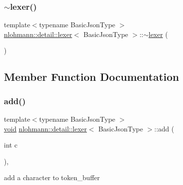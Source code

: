 \subsubsection{\texorpdfstring{$\sim$lexer()}{~lexer()}}
{\footnotesize\ttfamily template$<$typename Basic\+Json\+Type $>$ \\
\mbox{\hyperlink{classnlohmann_1_1detail_1_1lexer}{nlohmann\+::detail\+::lexer}}$<$ Basic\+Json\+Type $>$\+::$\sim$\mbox{\hyperlink{classnlohmann_1_1detail_1_1lexer}{lexer}} (\begin{DoxyParamCaption}{ }\end{DoxyParamCaption})\hspace{0.3cm}{\ttfamily [default]}}



\subsection{Member Function Documentation}
\mbox{\label{classnlohmann_1_1detail_1_1lexer_acec899d31af1fd647911e46e8535c283}} 
\subsubsection{\texorpdfstring{add()}{add()}}
{\footnotesize\ttfamily template$<$typename Basic\+Json\+Type $>$ \\
\mbox{\hyperlink{namespacenlohmann_1_1detail_a59fca69799f6b9e366710cb9043aa77d}{void}} \mbox{\hyperlink{classnlohmann_1_1detail_1_1lexer}{nlohmann\+::detail\+::lexer}}$<$ Basic\+Json\+Type $>$\+::add (\begin{DoxyParamCaption}\item[{int}]{c }\end{DoxyParamCaption})\hspace{0.3cm}{\ttfamily [inline]}, {\ttfamily [private]}}



add a character to token\+\_\+buffer 

\mbox{\label{classnlohmann_1_1detail_1_1lexer_a901e45a34e1fb1d97ab62350b0c3ef26}} 
